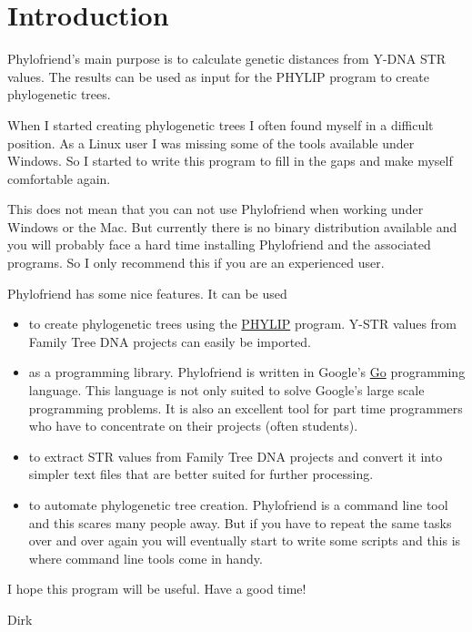 \section{Introduction}

Phylofriend's main purpose is to calculate genetic distances from
Y-DNA STR values. The results can be used as input for the
PHYLIP\cite{Phylip} program to create phylogenetic trees.

When I started creating phylogenetic trees I often found
myself in a difficult position. As a Linux user I was missing
some of the tools available under Windows. So I started
to write this program to fill in the gaps and make myself
comfortable again.

This does not mean that you can not use Phylofriend when
working under Windows or the Mac. But currently there is
no binary distribution available and you will probably face
a hard time installing Phylofriend and the associated programs.
So I only recommend this if you are an experienced user.

Phylofriend has some nice features. It can be used

\begin{itemize}
\item to create phylogenetic trees using the
	\href{http://evolution.genetics.washington.edu/phylip.html}{PHYLIP}\cite{Phylip}
	program. Y-STR values from Family Tree DNA projects can
	easily be imported.
\item as a programming library. Phylofriend is written in
	Google's \href{http://golang.org/}{Go} programming
	language. This language is not only suited to solve
	Google's large scale programming problems. It is also
	an excellent tool for part time programmers who have
	to concentrate on their projects (often students).
\item to extract STR values from Family Tree DNA projects
	and convert it into simpler text files that are
	better suited for further processing.
\item to automate phylogenetic tree creation. Phylofriend
	is a command line tool and this scares many people
	away. But if you have to repeat the same tasks over
	and over again you will eventually start to write some
	scripts and this is where command line tools come in
	handy.
\end{itemize}

I hope this program will be useful. Have a good time!

\vspace{1em} Dirk



